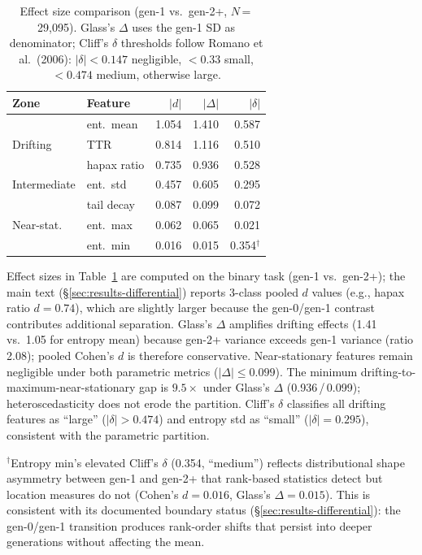 \begin{table}[ht]
\centering
\small
\caption{Effect size comparison (gen-1 vs.\ gen-2+, $N$\,=\,29{,}095). Glass's $\Delta$ uses the gen-1 SD as denominator; Cliff's $\delta$ thresholds follow Romano et al.\ (2006): $|\delta| < 0.147$ negligible, $< 0.33$ small, $< 0.474$ medium, otherwise large.}
\label{tab:effect-sizes}
\begin{tabular}{llrrr}
\toprule
\textbf{Zone} & \textbf{Feature} & \textbf{$|d|$} & \textbf{$|\Delta|$} & \textbf{$|\delta|$} \\
\midrule
\multirow{3}{*}{Drifting} & ent.\ mean & 1.054 & 1.410 & 0.587 \\
 & TTR & 0.814 & 1.116 & 0.510 \\
 & hapax ratio & 0.735 & 0.936 & 0.528 \\
\midrule
Intermediate & ent.\ std & 0.457 & 0.605 & 0.295 \\
\midrule
\multirow{3}{*}{Near-stat.} & tail decay & 0.087 & 0.099 & 0.072 \\
 & ent.\ max & 0.062 & 0.065 & 0.021 \\
 & ent.\ min & 0.016 & 0.015 & 0.354$^{\dagger}$ \\
\bottomrule
\end{tabular}
\end{table}

\noindent Effect sizes in Table~\ref{tab:effect-sizes} are computed on the binary task (gen-1 vs.\ gen-2+); the main text (\S\ref{sec:results-differential}) reports 3-class pooled $d$ values (e.g., hapax ratio $d{=}0.74$), which are slightly larger because the gen-0/gen-1 contrast contributes additional separation.
Glass's $\Delta$ amplifies drifting effects (1.41 vs.\ 1.05 for entropy mean) because gen-2+ variance exceeds gen-1 variance (ratio 2.08); pooled Cohen's $d$ is therefore conservative.
Near-stationary features remain negligible under both parametric metrics ($|\Delta| \leq 0.099$).
The minimum drifting-to-maximum-near-stationary gap is $9.5\times$ under Glass's $\Delta$ (0.936\,/\,0.099); heteroscedasticity does not erode the partition.
Cliff's $\delta$ classifies all drifting features as ``large'' ($|\delta| > 0.474$) and entropy std as ``small'' ($|\delta|{=}0.295$), consistent with the parametric partition.

\noindent $^{\dagger}$Entropy min's elevated Cliff's $\delta$ (0.354, ``medium'') reflects distributional shape asymmetry between gen-1 and gen-2+ that rank-based statistics detect but location measures do not (Cohen's $d{=}0.016$, Glass's $\Delta{=}0.015$).
This is consistent with its documented boundary status (\S\ref{sec:results-differential}): the gen-0/gen-1 transition produces rank-order shifts that persist into deeper generations without affecting the mean.
